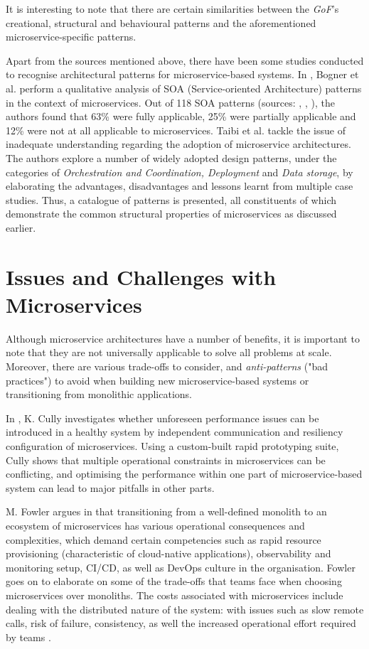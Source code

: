 It is interesting to note that there are certain similarities between the \textit{GoF}'s creational, structural and behavioural patterns \cite{gof94} and the aforementioned microservice-specific patterns.

Apart from the sources mentioned above, there have been some studies conducted to recognise architectural patterns for microservice-based systems. In \cite{bogner18}, Bogner et al. perform a qualitative analysis of SOA (Service-oriented Architecture) patterns in the context of microservices. Out of 118 SOA patterns (sources: \cite{erl09}, \cite{erl12}, \cite{rotem12}), the authors found that 63\% were fully applicable, 25\% were partially applicable and 12\% were not at all applicable to microservices. Taibi et al. \cite{taibi18} tackle the issue of inadequate understanding regarding the adoption of microservice architectures. The authors explore a number of widely adopted design patterns, under the categories of \textit{Orchestration and Coordination, Deployment} and \textit{Data storage}, by elaborating the advantages, disadvantages and lessons learnt from multiple case studies. Thus, a catalogue of patterns is presented, all constituents of which demonstrate the common structural properties of microservices as discussed earlier.

\section{Issues and Challenges with Microservices}

Although microservice architectures have a number of benefits, it is important to note that they are not universally applicable to solve all problems at scale. Moreover, there are various trade-offs to consider, and \textit{anti-patterns} ("bad practices") to avoid when building new microservice-based systems or transitioning from monolithic applications.

In \cite{cully20}, K. Cully investigates whether unforeseen performance issues can be introduced in a healthy system by independent communication and resiliency configuration of microservices. Using a custom-built rapid prototyping suite, Cully shows that multiple operational constraints in microservices can be conflicting, and optimising the performance within one part of microservice-based system can lead to major pitfalls in other parts.

M. Fowler argues in \cite{fowler14} that transitioning from a well-defined monolith to an ecosystem of microservices has various operational consequences and complexities, which demand certain competencies such as rapid resource provisioning (characteristic of cloud-native applications), observability and monitoring setup, CI/CD, as well as DevOps culture in the organisation. Fowler goes on to elaborate on some of the trade-offs that teams face when choosing microservices over monoliths. The costs associated with microservices include dealing with the distributed nature of the system: with issues such as slow remote calls, risk of failure, consistency, as well the increased operational effort required by teams \cite{fowler15}.


